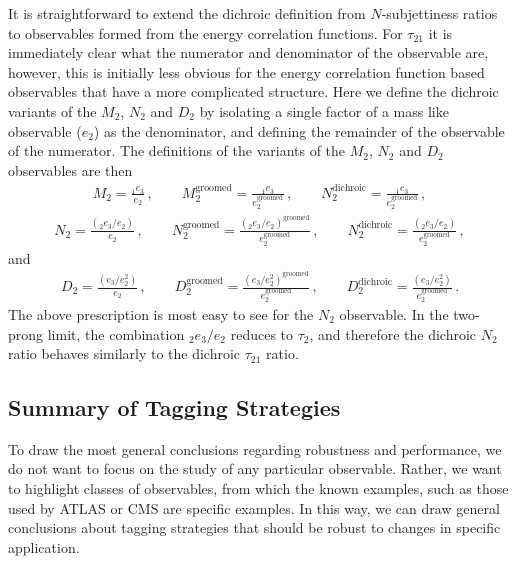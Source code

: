 \documentclass[11pt,letterpaper]{article}
\newcommand{\groomed}{\text{groomed}}
\newcommand{\ecfnobeta}[1]{e_{#1}}
\newcommand{\ecfvarnobeta}[2]{{_{#1}e_{#2}}}
\begin{document}
It is straightforward to extend the dichroic definition from $N$-subjettiness ratios to observables formed from the energy correlation functions.
%
For $\tau_{21}$ it is immediately clear what the numerator and denominator of the observable are, however, this is initially less obvious for the energy correlation function based observables that have a more complicated structure. Here we define the dichroic variants of the $M_2$, $N_2$ and $D_2$ by isolating a single factor of a mass like observable ($e_2$) as the denominator, and defining the remainder of the observable of the numerator.
%
The definitions of the variants of the $M_2$, $N_2$ and $D_2$ observables are then
\begin{align}
M_2= \frac{ \ecfvarnobeta{1}{3}  }{\ecfnobeta{2}}\,, \qquad  M_2^{\text{groomed}}= \frac{ \ecfvarnobeta{1}{3}  }{\ecfnobeta{2}^\groomed}\,, \qquad  N_2^{\text{dichroic}}= \frac{\ecfvarnobeta{1}{3}  }{\ecfnobeta{2}^\groomed}\,, 
\end{align}
\begin{align}
N_2= \frac{\left( \ecfvarnobeta{2}{3} / \ecfnobeta{2} \right) }{\ecfnobeta{2}}\,, \qquad  N_2^{\text{groomed}}= \frac{\left( \ecfvarnobeta{2}{3} / \ecfnobeta{2} \right)^\groomed }{\ecfnobeta{2}^\groomed}\,, \qquad  N_2^{\text{dichroic}}= \frac{\left( \ecfvarnobeta{2}{3} / \ecfnobeta{2} \right) }{\ecfnobeta{2}^\groomed}\,, 
\end{align}
and
\begin{align}
D_2=\frac{\left( \ecfnobeta{3} / \ecfnobeta{2}^2 \right)}{ \ecfnobeta{2}}\,, \qquad D_2^{\text{groomed}}=\frac{\left( \ecfnobeta{3} / \ecfnobeta{2}^2 \right)^\groomed}{ \ecfnobeta{2}^\groomed}\,, \qquad D_2^{\text{dichroic}}=\frac{\left( \ecfnobeta{3} / \ecfnobeta{2}^2 \right)}{ \ecfnobeta{2}^\groomed}\,.
\end{align}
The above prescription is most easy to see for the $N_2$ observable. In the two-prong limit, the combination $ \ecfvarnobeta{2}{3} / \ecfnobeta{2} $ reduces to $\tau_2$, and therefore the dichroic $N_2$ ratio behaves similarly to the dichroic $\tau_{21}$ ratio.

\subsection{Summary of Tagging Strategies}\label{sec:dichroic_sum}

To draw the most general conclusions regarding robustness and performance, we do not want to focus on the study of any particular observable.
%
Rather, we want to highlight classes of observables, from which the known examples, such as those used by ATLAS or CMS are specific examples.
%
In this way, we can draw general conclusions about tagging strategies that should be robust to changes in specific application.
\end{document}
